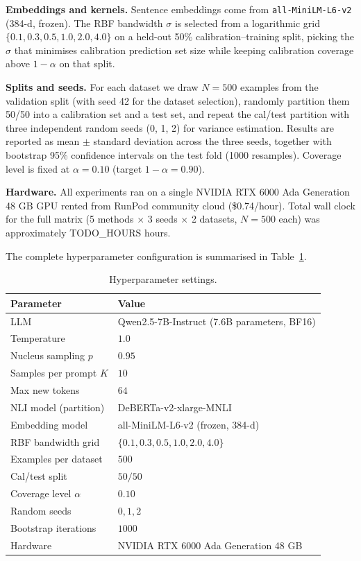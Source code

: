 \documentclass{article}
\begin{document}
\textbf{Embeddings and kernels.} Sentence embeddings come from \texttt{all-MiniLM-L6-v2} \citep{reimers2019sentencebert} (384-d, frozen). The RBF bandwidth $\sigma$ is selected from a logarithmic grid $\{0.1, 0.3, 0.5, 1.0, 2.0, 4.0\}$ on a held-out 50\% calibration--training split, picking the $\sigma$ that minimises calibration prediction set size while keeping calibration coverage above $1 - \alpha$ on that split.

\textbf{Splits and seeds.} For each dataset we draw $N = 500$ examples from the validation split (with seed 42 for the dataset selection), randomly partition them 50/50 into a calibration set and a test set, and repeat the cal/test partition with three independent random seeds (0, 1, 2) for variance estimation. Results are reported as mean $\pm$ standard deviation across the three seeds, together with bootstrap 95\% confidence intervals on the test fold (1000 resamples). Coverage level is fixed at $\alpha = 0.10$ (target $1 - \alpha = 0.90$).

\textbf{Hardware.} All experiments ran on a single NVIDIA RTX 6000 Ada Generation 48 GB GPU rented from RunPod community cloud (\$0.74/hour). Total wall clock for the full matrix (5 methods $\times$ 3 seeds $\times$ 2 datasets, $N = 500$ each) was approximately TODO\_HOURS hours.

The complete hyperparameter configuration is summarised in Table~\ref{tab:hyperparams}.

\begin{table}[ht]
\centering
\caption{Hyperparameter settings.}
\label{tab:hyperparams}
\begin{tabular}{ll}
\toprule
\textbf{Parameter} & \textbf{Value} \\
\midrule
LLM & Qwen2.5-7B-Instruct (7.6B parameters, BF16) \\
Temperature & $1.0$ \\
Nucleus sampling $p$ & $0.95$ \\
Samples per prompt $K$ & $10$ \\
Max new tokens & $64$ \\
NLI model (partition) & DeBERTa-v2-xlarge-MNLI \\
Embedding model & all-MiniLM-L6-v2 (frozen, 384-d) \\
RBF bandwidth grid & $\{0.1, 0.3, 0.5, 1.0, 2.0, 4.0\}$ \\
Examples per dataset & $500$ \\
Cal/test split & $50/50$ \\
Coverage level $\alpha$ & $0.10$ \\
Random seeds & $0, 1, 2$ \\
Bootstrap iterations & $1000$ \\
Hardware & NVIDIA RTX 6000 Ada Generation 48 GB \\
\bottomrule
\end{tabular}
\end{table}
\end{document}
